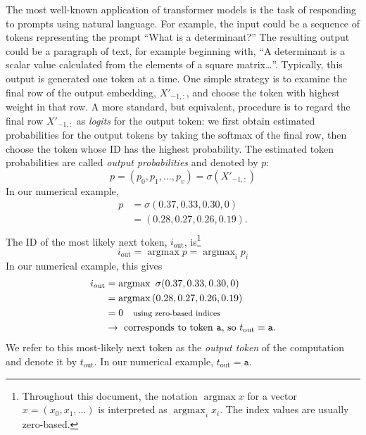 \documentclass{article}
\newcommand{\ta}{\mathtt{a}}
\DeclareMathOperator*{\argmax}{argmax}
\begin{document}
The most well-known application of transformer models is the task of
responding to prompts using natural language. For example, the input
could be a sequence of tokens representing the prompt ``What is a
determinant?''  The resulting output could be a paragraph of text, for
example beginning with, ``A determinant is a scalar value calculated
from the elements of a square matrix\ldots''. Typically, this output
is generated one token at a time. One simple strategy is to examine
the final row of the output embedding, $X'_{-1,:}$, and choose the
token with highest weight in that row. A more standard, but
equivalent, procedure is to regard the final row $X'_{-1,:}$ as
\emph{logits} for the output token: we first obtain estimated
probabilities for the output tokens by taking the softmax of the final
row, then choose the token whose ID has the highest probability. The
estimated token probabilities are called \emph{output probabilities}
and denoted by $p$:
\begin{displaymath}
  p = (p_0, p_1,\ldots, p_v) = \sigma(X'_{-1,:})
\end{displaymath}
In our numerical example,
\begin{displaymath}
  \begin{aligned}
    p &= \sigma(0.37, 0.33, 0.30, 0) \\
    &= (0.28, 0.27, 0.26, 0.19).\\
\end{aligned}
\end{displaymath}
The ID of the most likely next token, $i_\text{out}$,
is\footnote{Throughout this document, the notation $\argmax x$ for a
  vector $x=(x_0, x_1, \ldots)$ is interpreted as $\argmax_i x_i$. The
  index values are usually zero-based.}
\begin{displaymath}
  i_\text{out} = \argmax p = \argmax_i p_i
\end{displaymath}
In our numerical example, this gives
\begin{displaymath}
\begin{aligned}
  i_\text{out} &= \argmax \,\,\sigma(0.37, 0.33, 0.30, 0)\\
  &= \argmax \,(0.28, 0.27, 0.26, 0.19)\\
  &= 0  \quad \text{\footnotesize using zero-based indices}\\
  &\to \,\, \text{corresponds to token \texttt{a}, so $t_\text{out}=\ta$}.\\
\end{aligned}
\end{displaymath}
We refer to this most-likely next token as the \emph{output token} of
the computation and denote it by $t_\text{out}$. In our numerical
example, $t_\text{out}=\ta$.
\end{document}
